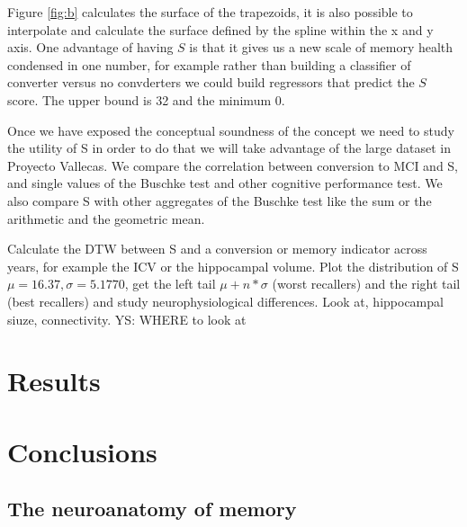 \documentclass[11pt]{article}
\theoremstyle{definition}
\theoremstyle{remark}
\begin{document}
Figure \ref{fig:b} calculates the surface of the trapezoids, it is also possible to interpolate and calculate the surface defined by the spline within the x and y axis.
One  advantage of having $S$ is that it gives us a new scale of memory health condensed in one number, for example rather than building a classifier of converter versus no convderters we could build regressors that predict the $S$ score. The upper bound is 32 and the minimum 0.

Once we have exposed the conceptual soundness of the concept we need to study the utility of S in order to do that we will take advantage of the large dataset in Proyecto Vallecas.
We compare the correlation between conversion to MCI and S, and single values of the Buschke test and other cognitive performance test. We also compare S with other aggregates of the Buschke test like the sum or the arithmetic and the geometric mean.

Calculate the DTW between S and a conversion or memory indicator across years, for example the ICV or the hippocampal volume. 
Plot the distribution of S $\mu = 16.37, \sigma=5.1770$, get the left tail $\mu + n*\sigma$ (worst recallers) and the right tail (best recallers) and study neurophysiological differences. Look at, hippocampal siuze, connectivity. YS: WHERE to look at

\section{Results}
\label{se:res}


\section{Conclusions}
\label{se:con}

\subsection{The neuroanatomy of memory}
\end{document}
